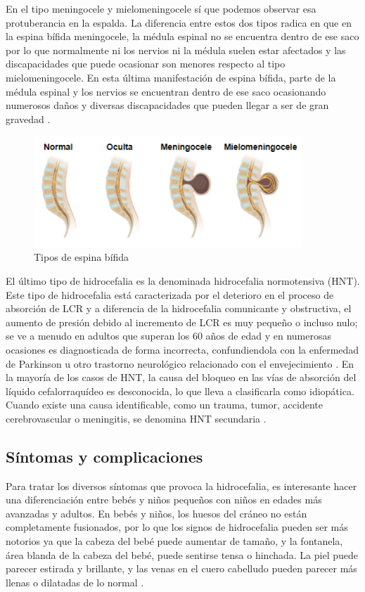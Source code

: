 En el tipo meningocele y mielomeningocele sí que podemos observar esa protuberancia en la espalda. La diferencia entre estos dos tipos radica en que en la espina bífida meningocele, la médula espinal no se encuentra dentro de ese saco por lo que normalmente ni los nervios ni la médula suelen estar afectados y las discapacidades que puede ocasionar son menores respecto al tipo mielomeningocele. En esta última manifestación de espina bífida, parte de la médula espinal y los nervios se encuentran dentro de ese saco ocasionando numerosos daños y diversas discapacidades que pueden llegar a ser de gran gravedad \cite{cdc_espina_bifida}.
\begin{figure}[h]
    \centering
    \includegraphics[width=0.9\textwidth]{img/tipos_espina.PNG}
    \caption{Tipos de espina bífida}
    \label{fig:tipos_espina}
\end{figure}

El último tipo de hidrocefalia es la denominada hidrocefalia normotensiva (HNT). Este tipo de hidrocefalia está caracterizada por el deterioro en el proceso de absorción de LCR y a diferencia de la hidrocefalia comunicante y obstructiva, el aumento de presión debido al incremento de LCR es muy pequeño o incluso nulo; se ve a menudo en adultos que superan los 60 años de edad y en numerosas ocasiones es diagnosticada de forma incorrecta, confundiendola con la enfermedad de Parkinson u otro trastorno neurológico relacionado con el envejecimiento \cite{elsevier_hidrocefalia_hnt}. 
En la mayoría de los casos de HNT, la causa del bloqueo en las vías de absorción del líquido cefalorraquídeo es desconocida, lo que lleva a clasificarla como idiopática. Cuando existe una causa identificable, como un trauma, tumor, accidente cerebrovascular o meningitis, se denomina HNT secundaria \cite{hnt-hidrocefalia-adultos}.

\subsection{Síntomas y complicaciones}
Para tratar los diversos síntomas que provoca la hidrocefalia, es interesante hacer una diferenciación entre bebés y niños pequeños con niños en edades más avanzadas y adultos.
En bebés y niños, los huesos del cráneo no están completamente fusionados, por lo que los signos de hidrocefalia pueden ser más notorios ya que la cabeza del bebé puede aumentar de tamaño, y la fontanela, área blanda de la cabeza del bebé, puede sentirse tensa o hinchada. La piel puede parecer estirada y brillante, y las venas en el cuero cabelludo pueden parecer más llenas o dilatadas de lo normal \cite{sint_niños}.

